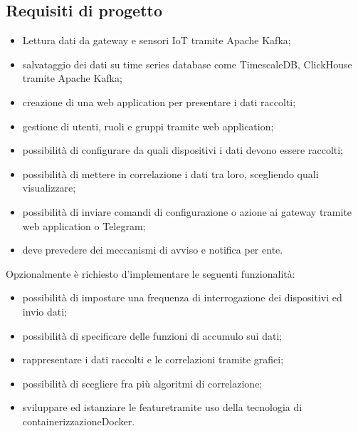 \subsection{Requisiti di progetto}
\begin{itemize}
	\item Lettura dati da gateway e sensori IoT tramite Apache Kafka;
	\item salvataggio dei dati su time series database come TimescaleDB, ClickHouse tramite Apache Kafka;
	\item creazione di una web application per presentare i dati raccolti;
	\item gestione di utenti, ruoli e gruppi tramite web application;
	\item possibilità di configurare da quali dispositivi i dati devono essere raccolti;
	\item possibilità di mettere in correlazione i dati tra loro, scegliendo quali visualizzare;
	\item possibilità di inviare comandi di configurazione o azione ai gateway tramite web application o Telegram;
	\item deve prevedere dei meccanismi di avviso e notifica per ente.
\end{itemize}
Opzionalmente è richiesto d'implementare le seguenti funzionalità:
\begin{itemize}
	\item possibilità di impostare una frequenza di interrogazione dei dispositivi ed invio dati;
	\item possibilità di specificare delle funzioni di accumulo sui dati;
	\item rappresentare i dati raccolti e le correlazioni tramite grafici;
	\item possibilità di scegliere fra più algoritmi di correlazione;
	\item sviluppare ed istanziare le feature\glosp tramite uso della tecnologia di containerizzazione\glosp Docker.
\end{itemize}

